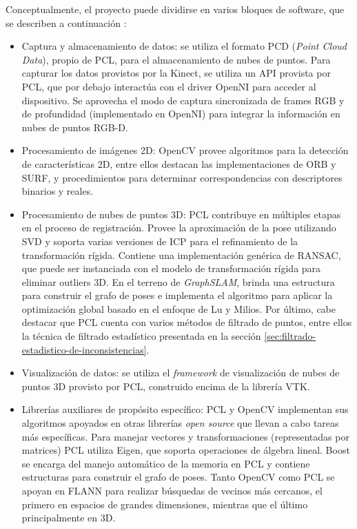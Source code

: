 Conceptualmente, el proyecto puede dividirse en varios bloques de software, que se describen a continuación :
\begin{itemize}

\item Captura y almacenamiento de datos: se utiliza el formato PCD (\textit{Point Cloud Data}), propio de PCL, para el almacenamiento de nubes de puntos. Para capturar los datos provistos por la Kinect, se utiliza un API provista por PCL, que por debajo interactúa con el driver OpenNI para acceder al dispositivo. Se aprovecha el modo de captura sincronizada de frames RGB y de profundidad (implementado en OpenNI) para integrar la información en nubes de puntos RGB-D.

\item Procesamiento de imágenes 2D: OpenCV provee algoritmos para la detección de características 2D, entre ellos destacan las implementaciones de ORB y SURF, y procedimientos para determinar correspondencias con descriptores binarios y reales.

\item Procesamiento de nubes de puntos 3D: PCL contribuye en múltiples etapas en el proceso de registración. Provee la aproximación de la pose utilizando SVD y soporta varias versiones de ICP para el refinamiento de la transformación rígida. Contiene una implementación genérica de RANSAC, que puede ser instanciada con el modelo de transformación rígida para eliminar outliers 3D. En el terreno de \textit{GraphSLAM}, brinda una estructura para construir el grafo de poses e implementa el algoritmo para aplicar la optimización global basado en el enfoque de Lu y Milios. Por último, cabe destacar que PCL cuenta con varios métodos de filtrado de puntos, entre ellos la técnica de filtrado estadístico presentada en la sección \ref{sec:filtrado-estadistico-de-inconsistencias}.

\item Visualización de datos: se utiliza el \textit{framework} de visualización de nubes de puntos 3D provisto por PCL, construido encima de la librería VTK.

\item Librerías auxiliares de propósito específico: PCL y OpenCV implementan sus algoritmos apoyados en otras librerías \textit{open source} que llevan a cabo tareas más específicas. Para manejar vectores y transformaciones (representadas por matrices) PCL utiliza Eigen, que soporta operaciones de álgebra lineal. Boost se encarga del manejo automático de la memoria en PCL y contiene estructuras para construir el grafo de poses. Tanto OpenCV como PCL se apoyan en FLANN para realizar búsquedas de vecinos más cercanos, el primero en espacios de grandes dimensiones, mientras que el último principalmente en 3D.

\end{itemize}

